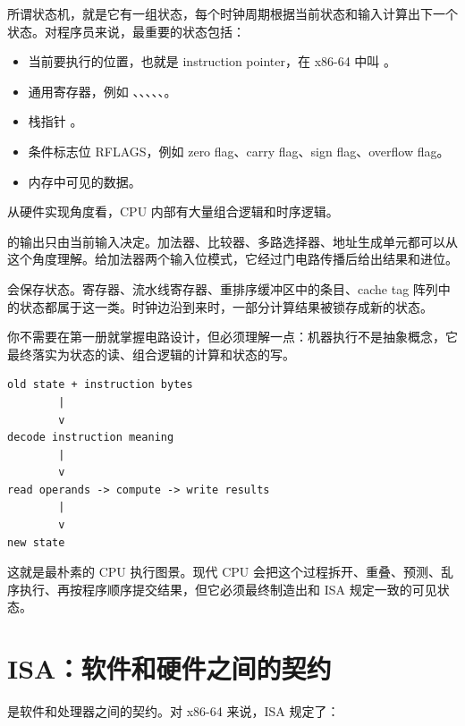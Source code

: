 所谓状态机，就是它有一组状态，每个时钟周期根据当前状态和输入计算出下一个状态。对程序员来说，最重要的状态包括：

\begin{itemize}
  \item 当前要执行的位置，也就是 instruction pointer，在 x86-64 中叫 。
  \item 通用寄存器，例如 、、、、、。
  \item 栈指针 。
  \item 条件标志位 RFLAGS，例如 zero flag、carry flag、sign flag、overflow flag。
  \item 内存中可见的数据。
\end{itemize}

从硬件实现角度看，CPU 内部有大量组合逻辑和时序逻辑。

 的输出只由当前输入决定。加法器、比较器、多路选择器、地址生成单元都可以从这个角度理解。给加法器两个输入位模式，它经过门电路传播后给出结果和进位。

 会保存状态。寄存器、流水线寄存器、重排序缓冲区中的条目、cache tag 阵列中的状态都属于这一类。时钟边沿到来时，一部分计算结果被锁存成新的状态。

你不需要在第一册就掌握电路设计，但必须理解一点：机器执行不是抽象概念，它最终落实为状态的读、组合逻辑的计算和状态的写。

\begin{center}
\begin{minipage}{0.82\linewidth}
\begin{verbatim}
old state + instruction bytes
        |
        v
decode instruction meaning
        |
        v
read operands -> compute -> write results
        |
        v
new state
\end{verbatim}
\end{minipage}
\end{center}

这就是最朴素的 CPU 执行图景。现代 CPU 会把这个过程拆开、重叠、预测、乱序执行、再按程序顺序提交结果，但它必须最终制造出和 ISA 规定一致的可见状态。

\section{ISA：软件和硬件之间的契约}

 是软件和处理器之间的契约。对 x86-64 来说，ISA 规定了：

